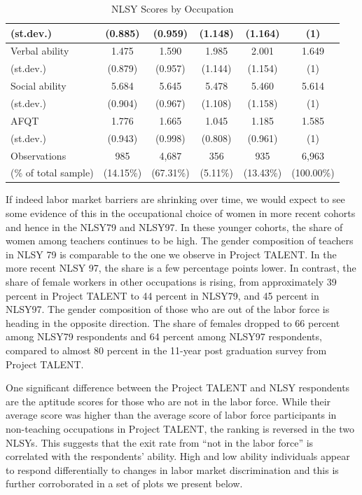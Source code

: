 \documentclass[onehalfspacing,11pt]{article}
\begin{document}
\begin{table}[h!]
\begin{tabular}{lccccc}
			\quad (st.dev.) & (0.885) & (0.959) & (1.148) & (1.164) & (1)\\
			\midrule
			Verbal ability & 1.475 & 1.590 & 1.985 & 2.001 &  1.649\\
			\quad (st.dev.) & (0.879) & (0.957) & (1.144) & (1.154) & (1)\\
			\midrule
			Social ability & 5.684 & 5.645 & 5.478 & 5.460 & 5.614\\
			\quad (st.dev.) & (0.904) & (0.967) & (1.108) & (1.158) & (1)\\
			\midrule
			AFQT & 1.776 & 1.665 & 1.045 & 1.185 & 1.585\\
			\quad (st.dev.) & (0.943) & (0.998) & (0.808) & (0.961) & (1)\\
			\midrule
			Observations &  985 & 4,687 &  356 & 935 & 6,963\\
			\quad (\% of total sample) & (14.15\%) & (67.31\%) & (5.11\%) & (13.43\%) & (100.00\%)\\
			\bottomrule
		\end{tabular}
		\caption{NLSY Scores by Occupation}
		\label{tab:NLSYscores}
	\end{table}
	
If indeed labor market barriers are shrinking over time, we would expect to see some evidence of this in the occupational choice of women in more recent cohorts and hence in the NLSY79 and NLSY97. In these younger cohorts, the share of women among teachers continues to be high. The gender composition of teachers in NLSY 79 is comparable to the one we observe in Project TALENT. In the more recent NLSY 97, the share is a few percentage points lower. In contrast, the share of female workers in other occupations is rising, from approximately 39 percent in Project TALENT to 44 percent in NLSY79, and 45 percent in NLSY97. The gender composition of those who are out of the labor force is heading in the opposite direction. The share of females dropped to 66 percent among NLSY79 respondents and 64 percent among NLSY97 respondents, compared to almost 80 percent in the 11-year post graduation survey from Project TALENT.

One significant difference between the Project TALENT and NLSY respondents are the aptitude scores for those who are not in the labor force. While their average score was higher than the average score of labor force participants in non-teaching occupations in Project TALENT, the ranking is reversed in the two NLSYs. This suggests that the exit rate from ``not in the labor force'' is correlated with the respondents' ability. High and low ability individuals appear to respond differentially to changes in labor market discrimination and this is further corroborated in a set of plots we present below. 
\end{document}
